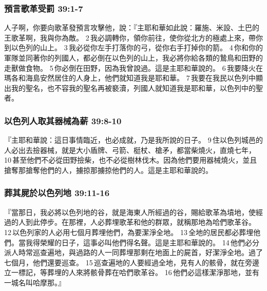 \subsubsection{預言歌革受罰 39:1-7}
人子啊，你要向歌革發預言攻擊他，說：『主耶和華如此說：羅施、米設、土巴的王歌革啊，我與你為敵。 2 我必調轉你，領你前往，使你從北方的極處上來，帶你到以色列的山上。 3 我必從你左手打落你的弓，從你右手打掉你的箭。 4 你和你的軍隊並同著你的列國人，都必倒在以色列的山上，我必將你給各類的鷙鳥和田野的走獸做食物。 5 你必倒在田野，因為我曾說過。這是主耶和華說的。 6 我要降火在瑪各和海島安然居住的人身上，他們就知道我是耶和華。 7 我要在我民以色列中顯出我的聖名，也不容我的聖名再被褻瀆，列國人就知道我是耶和華，以色列中的聖者。

\subsubsection{以色列人取其器械為薪 39:8-10}
『主耶和華說：這日事情臨近，也必成就，乃是我所說的日子。 9 住以色列城邑的人必出去撿器械，就是大小盾牌、弓箭、梃杖、槍矛，都當柴燒火，直燒七年， 10 甚至他們不必從田野撿柴，也不必從樹林伐木。因為他們要用器械燒火，並且搶奪那搶奪他們的人，擄掠那擄掠他們的人。這是主耶和華說的。


\subsubsection{葬其屍於以色列地 39:11-16}
『當那日，我必將以色列地的谷，就是海東人所經過的谷，賜給歌革為墳地，使經過的人到此停步。在那裡，人必葬埋歌革和他的群眾，就稱那地為哈們歌革谷。 12 以色列家的人必用七個月葬埋他們，為要潔淨全地。 13 全地的居民都必葬埋他們。當我得榮耀的日子，這事必叫他們得名聲。這是主耶和華說的。 14 他們必分派人時常巡查遍地，與過路的人一同葬埋那剩在地面上的屍首，好潔淨全地。過了七個月，他們還要巡查。 15 巡查遍地的人要經過全地，見有人的骸骨，就在旁邊立一標記，等葬埋的人來將骸骨葬在哈們歌革谷。 16 他們必這樣潔淨那地，並有一城名叫哈摩那。』

